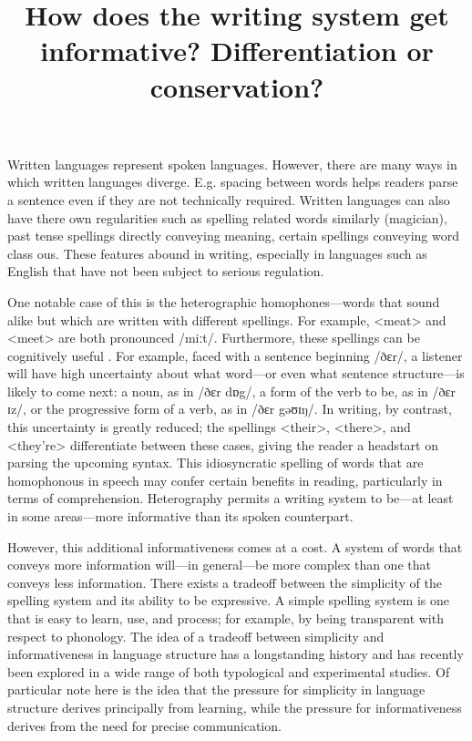 \documentclass[doc,biblatex]{apa7}
\title{How does the writing system get informative? Differentiation or conservation?}
\begin{document}
\maketitle

\noindent
Written languages represent spoken languages. However, there are many ways in which written languages diverge. E.g. spacing between words helps readers parse a sentence even if they are not technically required. Written languages can also have there own regularities such as spelling related words similarly (magician), past tense spellings directly conveying meaning, certain spellings conveying word class ous. These features abound in writing, especially in languages such as English that have not been subject to serious regulation.

One notable case of this is the heterographic homophones---words that sound alike but which are written with different spellings. For example, <meat> and <meet> are both pronounced /miːt/. Furthermore, these spellings can be cognitively useful . For example, faced with a sentence beginning /ðɛr/, a listener will have high uncertainty about what word---or even what sentence structure---is likely to come next: a noun, as in /ðɛr dɒg/, a form of the verb to be, as in /ðɛr ɪz/, or the progressive form of a verb, as in /ðɛr gəʊɪŋ/. In writing, by contrast, this uncertainty is greatly reduced; the spellings <their>, <there>, and <they're> differentiate between these cases, giving the reader a headstart on parsing the upcoming syntax. This idiosyncratic spelling of words that are homophonous in speech may confer certain benefits in reading, particularly in terms of comprehension. Heterography permits a writing system to be---at least in some areas---more informative than its spoken counterpart.

However, this additional informativeness comes at a cost. A system of words that conveys more information will---in general---be more complex than one that conveys less information. There exists a tradeoff between the simplicity of the spelling system and its ability to be expressive. A simple spelling system is one that is easy to learn, use, and process; for example, by being transparent with respect to phonology. The idea of a tradeoff between simplicity and informativeness in language structure has a longstanding history \parencite{Gabelentz:1891, Zipf:1949, Martinet:1952, Rosch:1978} and has recently been explored in a wide range of both typological \parencite{KempRegier:2012, Kemp:2018} and experimental \parencite{Carr:2020, Kirby:2015} studies. Of particular note here is the idea that the pressure for simplicity in language structure derives principally from learning, while the pressure for informativeness derives from the need for precise communication.
\end{document}
